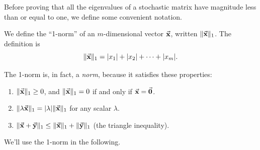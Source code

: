 Before proving that all the eigenvalues of a stochastic
matrix have magnitude less than or equal to one, we
define some convenient notation.

\begin{definition}
We define the ``1-norm'' of an $m$-dimensional vector
$\vec{\textbf{x}}$, written
$\|\vec{\textbf{x}}\|_1$.  The definition is
\begin{equation}
  \| \vec{\textbf{x}} \|_1 = |x_1| + |x_2| + \cdots + |x_m|.
\end{equation}
\end{definition}
The 1-norm is, in fact, a \emph{norm}, because it
satisfies these properties:
\begin{enumerate}
\item $\|\vec{\textbf{x}}\|_1 \ge 0$, and $\|\vec{\textbf{x}}\|_1 = 0$ if and only
if $\vec{\textbf{x}} = \vec{\textbf{0}}$.
\item $\|\lambda \vec{\textbf{x}}\|_1 = |\lambda|\|\vec{\textbf{x}}\|_1$ for any
scalar $\lambda$.
\item $\|\vec{\textbf{x}}+\vec{\textbf{y}}\|_1 \le \|\vec{\textbf{x}}\|_1 + \|\vec{\textbf{y}}\|_1$
(the triangle inequality).
\end{enumerate}

We'll use the 1-norm in the following.

